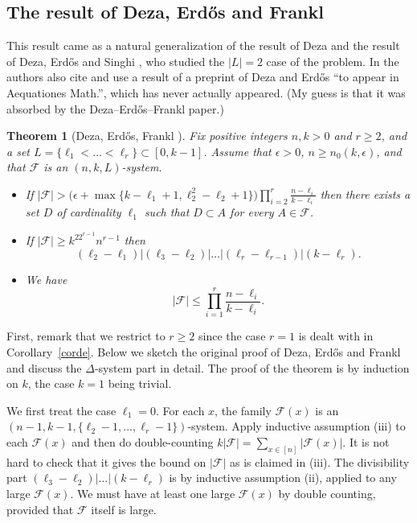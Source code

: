\documentclass[graybox]{svmult}
\renewcommand{\le}{\leqslant}
\renewcommand{\ge}{\geqslant}
\newcommand{\ff}{\mathcal{F}}
\newtheorem{thm}{Theorem}
\begin{document}
\subsection{The result of Deza, Erd\H os and Frankl}\label{sec23}
This result came as a natural generalization of the result of Deza \cite{D1} and the result of Deza, Erd\H os and Singhi \cite{DES}, who studied the $|L|=2$ case of the problem. In \cite{DES} the authors also cite and use a result of a preprint of Deza and Erd\H os ``to appear in Aequationes Math.'', which has never actually appeared. (My guess is that it was absorbed by the Deza--Erd\H os--Frankl paper.)
\begin{thm}[Deza, Erd\H os, Frankl \cite{DEF}]\label{thmdef}
Fix positive integers $n,k>0$ and $r\ge 2$, and a set $L=\{\ell_1<\ldots<\ell_r\}\subset [0,k-1]$. Assume that $\epsilon>0$, $n\ge n_0(k,\epsilon)$, and that $\ff$ is an $(n,k,L)$-system.
\begin{itemize}
  \item[(i)] If $|\ff|>\big(\epsilon+\max\{k-\ell_1+1,\ell_2^2-\ell_2+1\}\big) \prod_{i=2}^r\frac{n-\ell_i}{k-\ell_i}$ then there exists a set $D$ of cardinality $\ell_1$ such that $D\subset A$ for every $A\in \ff$.
  \item[(ii)] If $|\ff|\ge k^22^{r-1}n^{r-1}$ then
  $$(\ell_2-\ell_1)|(\ell_3-\ell_2)|\ldots |(\ell_r-\ell_{r-1})|(k-\ell_r).$$
  \item[(iii)] We have $$|\ff|\le \prod_{i=1}^r\frac{n-\ell_i}{k-\ell_i}.$$
\end{itemize}
\end{thm}
First, remark that we restrict to $r\ge 2$ since the case $r=1$ is dealt with in Corollary~\ref{corde}.
Below we sketch the original proof of Deza, Erd\H os and Frankl and discuss the $\Delta$-system part in detail. The proof of the theorem is by induction on $k$, the case $k=1$ being trivial.

We first  treat the case $\ell_1=0$. For each $x$, the family $\ff(x)$ is an $(n-1,k-1,\{\ell_2-1,\ldots, \ell_r-1\})$-system. Apply inductive assumption (iii)  to each $\ff(x)$ and then do double-counting $k|\ff| = \sum_{x\in[n]}|\ff(x)|$. It is not hard to check that it gives the bound on $|\ff|$ as is claimed in (iii). The divisibility part $(\ell_3-\ell_2)|\ldots|(k-\ell_r)$ is by inductive assumption (ii), applied to any large $\ff(x)$. We must have at least one large $\ff(x)$ by double counting, provided that $\ff$ itself is large.
\end{document}
